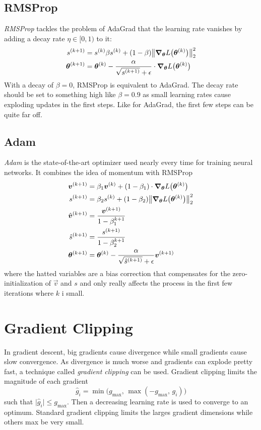 		\subsection{RMSProp}
			\emph{RMSProp} tackles the problem of AdaGrad that the learning rate vanishes by adding a decay rate \(\eta \in [0, 1)\) to it:
			\begin{align}
				s^{(k + 1)} &= s^{(k)} \beta s^{(k)} + (1 - \beta) \big\lVert \grad_{\bm{\theta}} L\bigl(\bm{\theta}^{(k)}\bigr) \big\rVert_2^2 \\
				\bm{\theta}^{(k + 1)} &= \bm{\theta}^{(k)} - \frac{\alpha}{\sqrt{s^{(k + 1)}} + \epsilon} \cdot \grad_{\bm{\theta}} L\bigl(\bm{\theta}^{(k)}\bigr)
			\end{align}
			With a decay of \( \beta = 0 \), RMSProp is equivalent to AdaGrad. The decay rate should be set to something high like \( \beta = 0.9 \) as small learning rates cause exploding updates in the first steps. Like for AdaGrad, the first few steps can be quite far off.

		\subsection{Adam}
			\emph{Adam} is the state-of-the-art optimizer used nearly every time for training neural networks. It combines the idea of momentum with RMSProp
			\begin{align}
				\bm{v}^{(k + 1)} &= \beta_1 \bm{v}^{(k)} + (1 - \beta_1) \cdot \grad_{\bm{\theta}} L\bigl(\bm{\theta}^{(k)}\bigr) \\
				s^{(k + 1)} &= \beta_2 s^{(k)} + (1 - \beta_2) \big\lVert \grad_{\bm{\theta}} L\bigl(\bm{\theta}^{(k)}\bigr) \big\rVert_2^2 \\
				\hat{\bm{v}}^{(k + 1)} &= \frac{\bm{v}^{(k + 1)}}{1 - \beta_1^{k + 1}} \\
				\hat{s}^{(k + 1)} &= \frac{s^{(k + 1)}}{1 - \beta_2^{k + 1}} \\
				\bm{\theta}^{(k + 1)} &= \bm{\theta}^{(k)} - \frac{\alpha}{\sqrt{\hat{s}^{(k + 1)}} + \epsilon} \bm{v}^{(k + 1)}
			\end{align}
			where the hatted variables are a bias correction that compensates for the zero-initialization of \(\vec{v}\) and \(s\) and only really affects the process in the first few iterations where \(k\) i small.

	\section{Gradient Clipping}
		In gradient descent, big gradients cause divergence while small gradients cause slow convergence. As divergence is much worse and gradients can explode pretty fast, a technique called \emph{gradient clipping} can be used. Gradient clipping limits the magnitude of each gradient
		\begin{equation}
			\hat{g}_i = \min\big( g_\mathrm{max},\, \max(-g_\mathrm{max},\, g_i) \big)
		\end{equation}
		such that \( \lvert \hat{g}_i \rvert \leq g_\mathrm{max} \). Then a decreasing learning rate is used to converge to an optimum. Standard gradient clipping limits the larges gradient dimensions while others max be very small.

